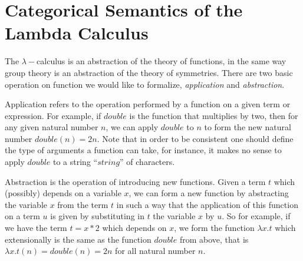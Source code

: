 %
%

\section{Categorical Semantics of the Lambda Calculus}


The $\lambda-$calculus is an abstraction of the theory of functions,
in the same way group theory is an abstraction of the theory of
symmetries. There are two basic operation on function we would like to
formalize, \emph{application} and \emph{abstraction}.

Application refers to the operation performed by a function on a given
term or expression. For example, if $double$ is the function that
multiplies by two, then for any given natural number $n$, we can apply
$double$ to $n$ to form the new natural number $double(n) = 2n$. Note
that in order to be consistent one should define the type of
arguments a function can take, for instance, it makes no sense to
apply $double$ to a string ``$string$'' of characters. 

Abstraction is the operation of introducing new functions. Given a
term $t$ which (possibly) depends on a variable $x$, we can form a
new function by abstracting the variable $x$ from the term $t$ in such a
way that the application of this function on a term $u$ is given by
substituting in $t$ the variable $x$ by $u$. So for example, if we
have the term $t = x * 2$ which depends on $x$, we form the function
$\lambda x.t$ which extensionally is the same as the function $double$
from above, that is $\lambda x.t(n) = double(n) = 2n$ for all natural
number $n$.

